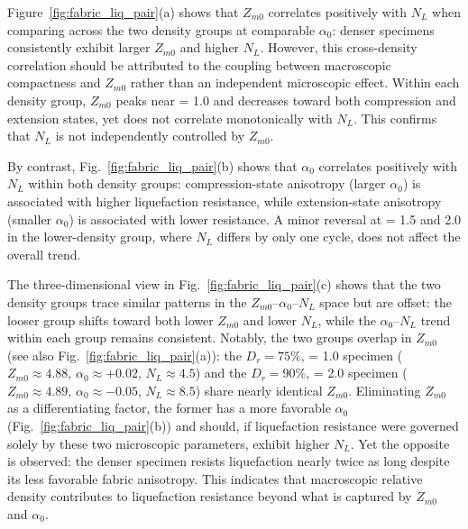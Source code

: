 Figure~\ref{fig:fabric_liq_pair}(a) shows that $Z_{m0}$ correlates positively with $N_L$ when comparing across the two density groups at comparable $\alpha_0$: denser specimens consistently exhibit larger $Z_{m0}$ and higher $N_L$. However, this cross-density correlation should be attributed to the coupling between macroscopic compactness and $Z_{m0}$ rather than an independent microscopic effect. Within each density group, $Z_{m0}$ peaks near \Kzero{} = 1.0 and decreases toward both compression and extension states, yet does not correlate monotonically with $N_L$. This confirms that $N_L$ is not independently controlled by $Z_{m0}$.

By contrast, Fig.~\ref{fig:fabric_liq_pair}(b) shows that $\alpha_0$ correlates positively with $N_L$ within both density groups: compression-state anisotropy (larger $\alpha_0$) is associated with higher liquefaction resistance, while extension-state anisotropy (smaller $\alpha_0$) is associated with lower resistance. A minor reversal at \Kzero{} = 1.5 and 2.0 in the lower-density group, where $N_L$ differs by only one cycle, does not affect the overall trend.

The three-dimensional view in Fig.~\ref{fig:fabric_liq_pair}(c) shows that the two density groups trace similar patterns in the $Z_{m0}$--$\alpha_0$--$N_L$ space but are offset: the looser group shifts toward both lower $Z_{m0}$ and lower $N_L$, while the $\alpha_0$--$N_L$ trend within each group remains consistent. Notably, the two groups overlap in $Z_{m0}$ (see also Fig.~\ref{fig:fabric_liq_pair}(a)): the $D_r = 75\%$, \Kzero{} = 1.0 specimen ($Z_{m0} \approx 4.88$, $\alpha_0 \approx +0.02$, $N_L \approx 4.5$) and the $D_r = 90\%$, \Kzero{} = 2.0 specimen ($Z_{m0} \approx 4.89$, $\alpha_0 \approx -0.05$, $N_L \approx 8.5$) share nearly identical $Z_{m0}$. Eliminating $Z_{m0}$ as a differentiating factor, the former has a more favorable $\alpha_0$ (Fig.~\ref{fig:fabric_liq_pair}(b)) and should, if liquefaction resistance were governed solely by these two microscopic parameters, exhibit higher $N_L$. Yet the opposite is observed: the denser specimen resists liquefaction nearly twice as long despite its less favorable fabric anisotropy. This indicates that macroscopic relative density contributes to liquefaction resistance beyond what is captured by $Z_{m0}$ and $\alpha_0$.

